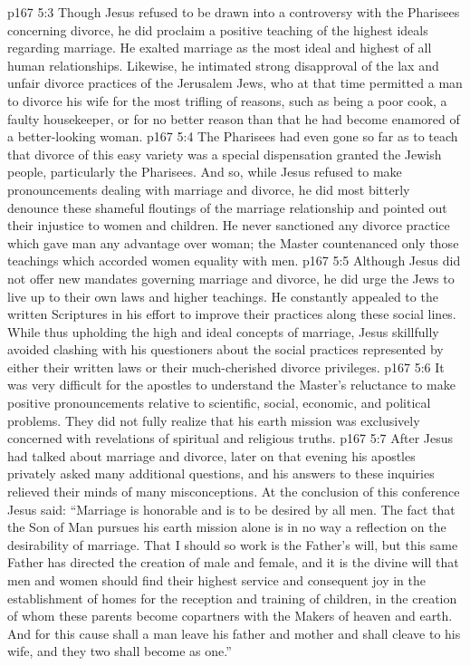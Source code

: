 \vs p167 5:3 Though Jesus refused to be drawn into a controversy with the Pharisees concerning divorce, he did proclaim a positive teaching of the highest ideals regarding marriage. He exalted marriage as the most ideal and highest of all human relationships. Likewise, he intimated strong disapproval of the lax and unfair divorce practices of the Jerusalem Jews, who at that time permitted a man to divorce his wife for the most trifling of reasons, such as being a poor cook, a faulty housekeeper, or for no better reason than that he had become enamored of a better\hyp{}looking woman.
\vs p167 5:4 The Pharisees had even gone so far as to teach that divorce of this easy variety was a special dispensation granted the Jewish people, particularly the Pharisees. And so, while Jesus refused to make pronouncements dealing with marriage and divorce, he did most bitterly denounce these shameful floutings of the marriage relationship and pointed out their injustice to women and children. He never sanctioned any divorce practice which gave man any advantage over woman; the Master countenanced only those teachings which accorded women equality with men.
\vs p167 5:5 Although Jesus did not offer new mandates governing marriage and divorce, he did urge the Jews to live up to their own laws and higher teachings. He constantly appealed to the written Scriptures in his effort to improve their practices along these social lines. While thus upholding the high and ideal concepts of marriage, Jesus skillfully avoided clashing with his questioners about the social practices represented by either their written laws or their much\hyp{}cherished divorce privileges.
\vs p167 5:6 It was very difficult for the apostles to understand the Master’s reluctance to make positive pronouncements relative to scientific, social, economic, and political problems. They did not fully realize that his earth mission was exclusively concerned with revelations of spiritual and religious truths.
\vs p167 5:7 After Jesus had talked about marriage and divorce, later on that evening his apostles privately asked many additional questions, and his answers to these inquiries relieved their minds of many misconceptions. At the conclusion of this conference Jesus said: \textcolor{ubdarkred}{“Marriage is honorable and is to be desired by all men. The fact that the Son of Man pursues his earth mission alone is in no way a reflection on the desirability of marriage. That I should so work is the Father’s will, but this same Father has directed the creation of male and female, and it is the divine will that men and women should find their highest service and consequent joy in the establishment of homes for the reception and training of children, in the creation of whom these parents become copartners with the Makers of heaven and earth. And for this cause shall a man leave his father and mother and shall cleave to his wife, and they two shall become as one.”}
